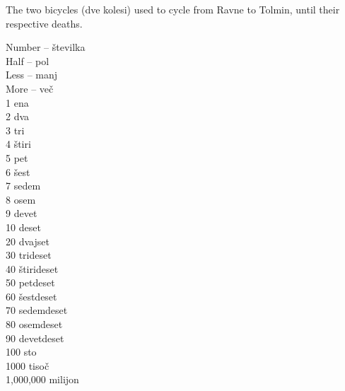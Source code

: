\begin{marginfigure}
\checkoddpage \ifoddpage \forcerectofloat \else \forceversofloat \fi
\centering
 \caption{The two bicycles (dve kolesi) used to cycle from Ravne to Tolmin, until their respective deaths. }
 \label{kolo}
\end{marginfigure}

Number -- številka\\
Half --  pol\\
Less -- manj\\
More -- več\\
1 ena\\
2 dva\\
3 tri\\
4 štiri\\
5 pet\\
6 šest\\
7 sedem\\
8 osem\\
9 devet\\
10 deset\\
20 dvajset\\
30 trideset\\
40 štirideset\\
50 petdeset\\
60 šestdeset\\
70 sedemdeset\\
80 osemdeset\\
90 devetdeset\\
100 sto\\
1000 tisoč\\
1,000,000 milijon\\


